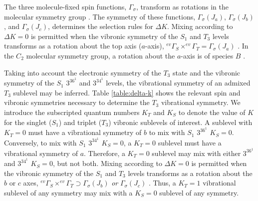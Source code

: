\documentclass[12pt]{mitthesis}
\begin{document}
The three molecule-fixed spin functions, $\Gamma_{\sigma}$, transform
as rotations in the molecular symmetry group \cite{hougen64,
  stevens73}.  The symmetry of these functions,
$\Gamma_{\sigma}(J_a)$, $\Gamma_{\sigma}(J_b)$, and
$\Gamma_{\sigma}(J_c)$, determines the selection rules for $\Delta K$.
Mixing according to $\Delta K =0$ is permitted when the vibronic
symmetry of the $S_1$ and $T_3$ levels transforms as a rotation about
the top axis ($a$-axis), $^{ev}\Gamma_S \times ^{ev}\Gamma_T =
\Gamma_{\sigma}( J_a)$ \cite{stevens73}.  In the $C_2$ molecular
symmetry group, a rotation about the $a$-axis is of species $B$
\cite{bunker98}.

Taking into account the electronic symmetry of the $T_3$ state and the
vibronic symmetry of the $S_1$ $3^36^1$ and $3^34^1$ levels, the
vibrational symmetry of an admixed $T_3$ sublevel may be inferred.
Table \ref{table:delta-k} shows the relevant spin and vibronic
symmetries necessary to determine the $T_3$ vibrational symmetry. We
introduce the subscripted quantum numbers $K_T$ and $K_S$ to denote
the value of $K$ for the singlet ($S_1$) and triplet ($T_3$) vibronic
sublevels of interest.  A sublevel with $K_T=0$ must have a
vibrational symmetry of $b$ to mix with $S_1$ $3^36^1$ $K_S=0$.
Conversely, to mix with $S_1$ $3^34^1$ $K_S=0$, a $K_T=0$ sublevel
must have a vibrational symmetry of $a$.  Therefore, a $K_T=0$
sublevel may mix with either $3^36^1$ and $3^34^1$ $K_S=0$, but not
both.  Mixing according to $\Delta K =0$ is permitted when the
vibronic symmetry of the $S_1$ and $T_3$ levels transforms as a
rotation about the $b$ or $c$ axes, $^{ev}\Gamma_S \times
^{ev}\Gamma_T \supset \Gamma_{\sigma}(J_b)$ \emph{or} $\Gamma_{\sigma}(J_c)$
\cite{stevens73}.  Thus, a $K_T=1$ vibrational sublevel of any
symmetry may mix with a $K_S=0$ sublevel of any symmetry.
\end{document}

